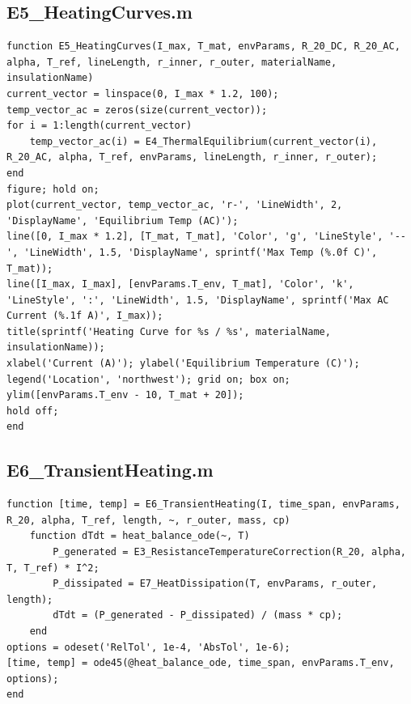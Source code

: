 \documentclass[12pt, a4paper]{article}
\begin{document}
\subsection{E5\_HeatingCurves.m}
\begin{lstlisting}[caption={Generates plots of equilibrium temperature vs. current.}, label={lst:E5}]
function E5_HeatingCurves(I_max, T_mat, envParams, R_20_DC, R_20_AC, alpha, T_ref, lineLength, r_inner, r_outer, materialName, insulationName)
current_vector = linspace(0, I_max * 1.2, 100);
temp_vector_ac = zeros(size(current_vector));
for i = 1:length(current_vector)
    temp_vector_ac(i) = E4_ThermalEquilibrium(current_vector(i), R_20_AC, alpha, T_ref, envParams, lineLength, r_inner, r_outer);
end
figure; hold on;
plot(current_vector, temp_vector_ac, 'r-', 'LineWidth', 2, 'DisplayName', 'Equilibrium Temp (AC)');
line([0, I_max * 1.2], [T_mat, T_mat], 'Color', 'g', 'LineStyle', '--', 'LineWidth', 1.5, 'DisplayName', sprintf('Max Temp (%.0f C)', T_mat));
line([I_max, I_max], [envParams.T_env, T_mat], 'Color', 'k', 'LineStyle', ':', 'LineWidth', 1.5, 'DisplayName', sprintf('Max AC Current (%.1f A)', I_max));
title(sprintf('Heating Curve for %s / %s', materialName, insulationName));
xlabel('Current (A)'); ylabel('Equilibrium Temperature (C)');
legend('Location', 'northwest'); grid on; box on;
ylim([envParams.T_env - 10, T_mat + 20]);
hold off;
end
\end{lstlisting}

\subsection{E6\_TransientHeating.m}
\begin{lstlisting}[caption={Models the temperature of a conductor over time (transient response).}, label={lst:E6}]
function [time, temp] = E6_TransientHeating(I, time_span, envParams, R_20, alpha, T_ref, length, ~, r_outer, mass, cp)
    function dTdt = heat_balance_ode(~, T)
        P_generated = E3_ResistanceTemperatureCorrection(R_20, alpha, T, T_ref) * I^2;
        P_dissipated = E7_HeatDissipation(T, envParams, r_outer, length);
        dTdt = (P_generated - P_dissipated) / (mass * cp);
    end
options = odeset('RelTol', 1e-4, 'AbsTol', 1e-6);
[time, temp] = ode45(@heat_balance_ode, time_span, envParams.T_env, options);
end
\end{lstlisting}
\end{document}
